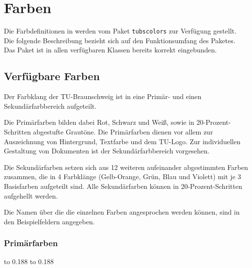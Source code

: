 \chapter{Farben}

Die Farbdefinitionen in \tubslatex werden vom Paket \lstinline{tubscolors}
zur Verfügung gestellt. Die folgende Beschreibung bezieht sich
auf den Funktionsumfang des Paketes. Das Paket ist in allen verfügbaren
Klassen bereits korrekt eingebunden.

\newcommand{\rainbow}[2][\relax]{{\noindent\sffamily\footnotesize%
\ifx#1\relax\colorlet{fglbg}{black}\else\colorlet{fglbg}{#1}\fi
\colorbox{#2100}{\hbox to 0.188\textwidth{%
  \color{fglbg}\vphantom{Fg}#2{}100\hfill}}%
\colorbox{#280}{\hbox to 0.188\textwidth{%
  \color{fglbg}\vphantom{Fg}#2{}80\hfill}}%
\colorbox{#260}{\hbox to 0.188\textwidth{\vphantom{Fg}#2{}60\hfill}}%
\colorbox{#240}{\hbox to 0.188\textwidth{\vphantom{Fg}#2{}40\hfill}}%
\colorbox{#220}{\hbox to 0.188\textwidth{\vphantom{Fg}#2{}20\hfill}}\\%
}}

\section{Verfügbare Farben}

Der Farbklang der TU-Braunschweig ist in eine Primär- und einen
Sekundärfarbbereich aufgeteilt.

Die Primärfarben bilden dabei Rot, Schwarz und Weiß, sowie in
20-Prozent-Schritten abgestufte Grautöne. Die Primärfarben dienen
vor allem zur Auszeichnung von Hintergrund, Textfarbe und dem TU-Logo.
Zur individuellen Gestaltung von Dokumenten ist der Sekundärfarbbereich
vorgesehen.

Die Sekundärfarben setzen sich aus 12 weiteren aufeinander abgestimmten
Farben zusammen, die 
in 4 Farbklänge (Gelb-Orange, Grün, Blau und Violett) mit je 3 Basisfarben
aufgeteilt sind.
Alle Sekundärfarben können in 20-Prozent-Schritten aufgehellt werden.

Die Namen über die die einzelnen Farben angesprochen werden können, sind in den
Beispielfeldern angegeben.

\subsection{Primärfarben}

{\sffamily\footnotesize%
\colorbox{tuRed}{\hbox to 0.188}%
\colorbox{tuBlack}{\hbox to 0.188}%
\\%
}

